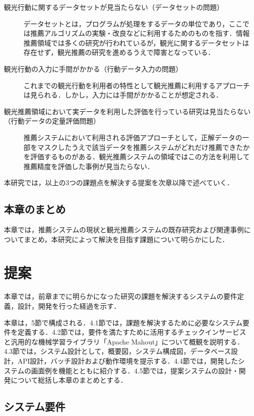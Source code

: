 \documentclass{jsarticle}
\begin{document}
\begin{description}
\item[観光行動に関するデータセットが見当たらない（データセットの問題）]
       データセットとは，プログラムが処理をするデータの単位であり，ここでは推薦アルゴリズムの実験・改良などに利用するためのものを指す．情報推薦領域では多くの研究が行われているが，観光に関するデータセットは存在せず，観光推薦の研究を進めるうえで障害となっている．
\item[観光行動の入力に手間がかかる（行動データ入力の問題）]
       これまでの観光行動を利用者の特性として観光推薦に利用するアプローチは見られる．しかし，入力には手間がかかることが想定される．
\item[観光推薦領域において実データを利用した評価を行っている研究は見当たらない（行動データの定量評価問題）]
       推薦システムにおいて利用される評価アプローチとして，正解データの一部をマスクしたうえで該当データを推薦システムがどれだけ推薦できたかを評価するものがある．観光推薦システムの領域ではこの方法を利用して推薦精度を評価した事例が見当たらない．
\end{description}

本研究では，以上の3つの課題点を解決する提案を次章以降で述べていく．

\subsection{本章のまとめ}

本章では，推薦システムの現状と観光推薦システムの既存研究および関連事例についてまとめ，本研究によって解決を目指す課題について明らかにした． 

\newpage

\section{提案}

本章では，前章までに明らかになった研究の課題を解決するシステムの要件定義，設計，開発を行った経過を示す．

本章は，5節で構成される．4.1節では，課題を解決するために必要なシステム要件を定義する．4.2節では，要件を満たすために活用するチェックインサービスと汎用的な機械学習ライブラリ「Apache Mahout」について概観を説明する．4.3節では，システム設計として，概要図，システム構成図，データベース設計，API設計，バッチ設計および動作環境を提示する．4.4節では，開発したシステムの画面例を機能とともに紹介する．4.5節では，提案システムの設計・開発について総括し本章のまとめとする．

\newpage
\subsection{システム要件}
\end{document}
